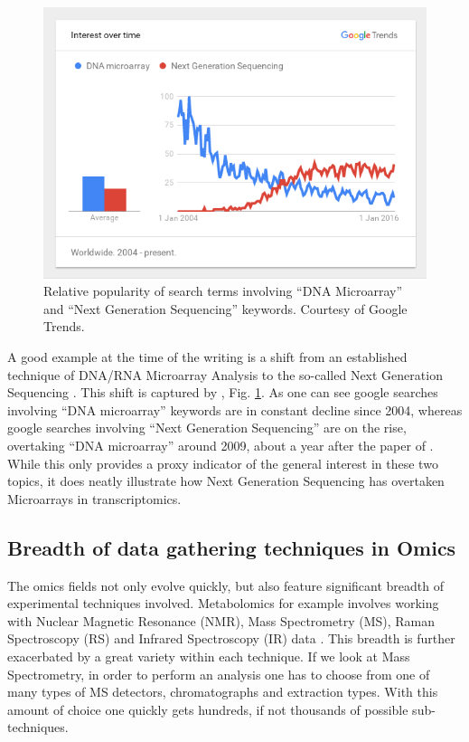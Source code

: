 \begin{figure}[ht]
	\centering
	\includegraphics[width=135mm]{MicroarrayVSSequencing.png}
    \caption{Relative popularity of search terms involving ``DNA Microarray'' and ``Next Generation Sequencing'' keywords. Courtesy of Google Trends.}
    \label{microVsSeq}
\end{figure}


A good example at the time of the writing is a shift from an established technique of DNA/RNA Microarray Analysis to the so-called Next Generation Sequencing \parencite{Mardis2008}. This shift is captured by \textcite{GoogleTrends}, Fig. \ref{microVsSeq}. As one can see google searches involving ``DNA microarray'' keywords are in constant decline since 2004, whereas google searches involving ``Next Generation Sequencing'' are on the rise, overtaking ``DNA microarray'' around 2009, about a year after the paper of \textcite{Mardis2008}. While this only provides a proxy indicator of the general interest in these two topics, it does neatly illustrate how Next Generation Sequencing has overtaken Microarrays in transcriptomics.

\subsection{Breadth of data gathering techniques in Omics}

The omics fields not only evolve quickly, but also feature significant breadth of experimental techniques involved. Metabolomics for example involves working with Nuclear Magnetic Resonance (NMR), Mass Spectrometry (MS), Raman Spectroscopy (RS) and Infrared Spectroscopy (IR) data \parencite{Madsen2010}. This breadth is further exacerbated by a great variety within each technique. If we look at Mass Spectrometry, in order to perform an analysis one has to choose from one of many types of MS detectors, chromatographs and extraction types. With this amount of choice one quickly gets hundreds, if not thousands of possible sub-techniques.

